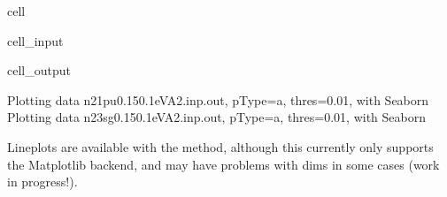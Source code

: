 \documentclass[letterpaper,10pt,english]{jupyterBook}
\begin{document}
\begin{sphinxuseclass}{cell}\begin{sphinxVerbatimInput}

\begin{sphinxuseclass}{cell_input}
\begin{sphinxVerbatim}[commandchars=\\\{\}]
  
\end{sphinxVerbatim}

\end{sphinxuseclass}\end{sphinxVerbatimInput}
\begin{sphinxVerbatimOutput}

\begin{sphinxuseclass}{cell_output}
\begin{sphinxVerbatim}[commandchars=\\\{\}]
Plotting data n2\PYGZus{}1pu\PYGZus{}0.1\PYGZhy{}50.1eV\PYGZus{}A2.inp.out, pType=a, thres=0.01, with Seaborn
Plotting data n2\PYGZus{}3sg\PYGZus{}0.1\PYGZhy{}50.1eV\PYGZus{}A2.inp.out, pType=a, thres=0.01, with Seaborn
\end{sphinxVerbatim}

\noindent{}

\noindent{}

\end{sphinxuseclass}\end{sphinxVerbatimOutput}

\end{sphinxuseclass}
\sphinxAtStartPar
Line\sphinxhyphen{}plots are available with the  method, although this currently only supports the Matplotlib backend, and may have problems with dims in some cases (work in progress!).
\end{document}
